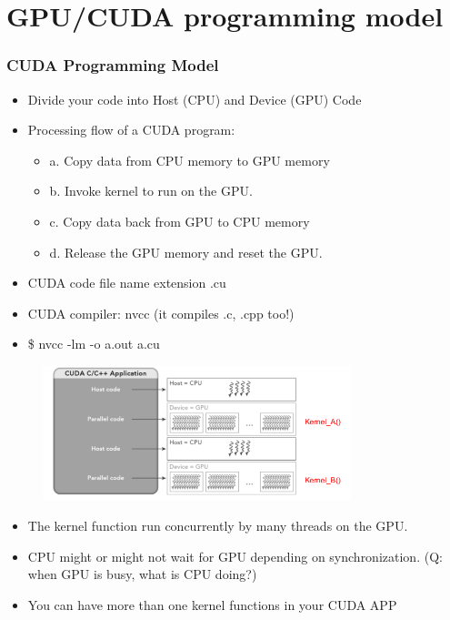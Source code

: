 \documentclass[xcolor={x11names,svgnames,dvipsnames}]{beamer}
\begin{document}
\section {GPU/CUDA programming model}
\begin{frame}
\frametitle{CUDA Programming Model}
\begin{itemize}
\item Divide your code into Host (CPU) and Device (GPU) Code
\item Processing flow of a CUDA program:
\begin{itemize}
\item a. Copy data from CPU memory to GPU memory
\item b. Invoke kernel to run on the GPU.
\item c. Copy data back from GPU to CPU memory
\item  d. Release the GPU memory and reset the GPU.
\end{itemize}

\item CUDA code file name extension .cu
\item CUDA compiler: nvcc (it compiles .c, .cpp too!)

\item \$ nvcc -lm -o a.out a.cu
\end{itemize}

\end{frame}


\begin{frame}
 \begin{figure}
     \includegraphics[width=0.8\textwidth, height=0.5\textheight]{kernel.png}
\end{figure}

\begin{itemize}
\item The kernel function run concurrently by many threads on the GPU.
\item CPU might or might not wait for GPU depending on synchronization.
(Q: when GPU is busy, what is CPU doing?)
\item You can have more than one kernel functions in your CUDA APP
\end{itemize}
\end{frame}
\end{document}
